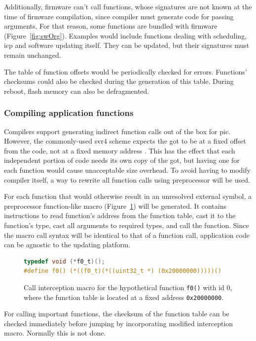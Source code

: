 Additionally, firmware can't call functions, whose signatures are not known at the time of firmware compilation, since compiler must generate code for passing arguments. For that reason, some functions are bundled with firmware (Figure~\ref{fig:swOrg}). Examples would include functions dealing with scheduling, \gls{icp} and software updating itself. They can be updated, but their signatures must remain unchanged.

The table of function offsets would be periodically checked for errors. Functions' checksums could also be checked during the generation of this table. During reboot, flash memory can also be defragmented.

\subsubsection{Compiling application functions}

Compilers support generating indirect function calls out of the box for \gls{pic}. However, the commonly-used \gls{svr4} scheme expects the \gls{got} to be at a fixed offset from the code, not at a fixed memory address \cite[Chapter~8]{Levine1999}. This has the effect that each independent portion of code needs its own copy of the \gls{got}, but having one for each function would cause unacceptable size overhead. To avoid having to modify compiler itself, a way to rewrite all function calls using preprocessor will be used.

For each function that would otherwise result in an unresolved external symbol, a preprocessor function-like macro (Figure~\ref{fig:macro}) will be generated. It contains instructions to read function's address from the function table, cast it to the function's type, cast all arguments to required types, and call the function. Since the macro call syntax will be identical to that of a function call, application code can be agnostic to the updating platform.

\begin{figure} [htb]
\begin{lstlisting}[language=C]
typedef void (*f0_t)();
#define f0() (*((f0_t)(*((uint32_t *) (0x20000000)))))()
\end{lstlisting}
\caption{Call interception macro for the hypothetical function \texttt{f0()} with id 0, where the function table is located at a fixed address \texttt{0x20000000}.}
\label{fig:macro}
\end{figure}

For calling important functions, the checksum of the function table can be checked immediately before jumping by incorporating modified interception macro. Normally this is not done.

